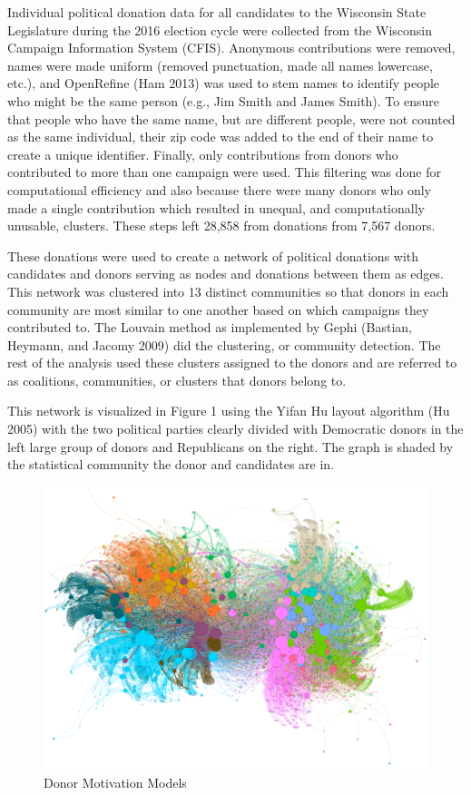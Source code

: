 \documentclass[12pt,]{article}
\begin{document}
Individual political donation data for all candidates to the Wisconsin
State Legislature during the 2016 election cycle were collected from the
Wisconsin Campaign Information System (CFIS). Anonymous contributions
were removed, names were made uniform (removed punctuation, made all
names lowercase, etc.), and OpenRefine (Ham 2013) was used to stem names
to identify people who might be the same person (e.g., Jim Smith and
James Smith). To ensure that people who have the same name, but are
different people, were not counted as the same individual, their zip
code was added to the end of their name to create a unique identifier.
Finally, only contributions from donors who contributed to more than one
campaign were used. This filtering was done for computational efficiency
and also because there were many donors who only made a single
contribution which resulted in unequal, and computationally unusable,
clusters. These steps left 28,858 from donations from 7,567 donors.

These donations were used to create a network of political donations
with candidates and donors serving as nodes and donations between them
as edges. This network was clustered into 13 distinct communities so
that donors in each community are most similar to one another based on
which campaigns they contributed to. The Louvain method as implemented
by Gephi (Bastian, Heymann, and Jacomy 2009) did the clustering, or
community detection. The rest of the analysis used these clusters
assigned to the donors and are referred to as coalitions, communities,
or clusters that donors belong to.

This network is visualized in Figure 1 using the Yifan Hu layout
algorithm (Hu 2005) with the two political parties clearly divided with
Democratic donors in the left large group of donors and Republicans on
the right. The graph is shaded by the statistical community the donor
and candidates are in.

\begin{figure}
\centering
\includegraphics{../tables_and_figures/fig_1_white.png}
\caption{Donor Motivation Models}
\end{figure}
\end{document}
